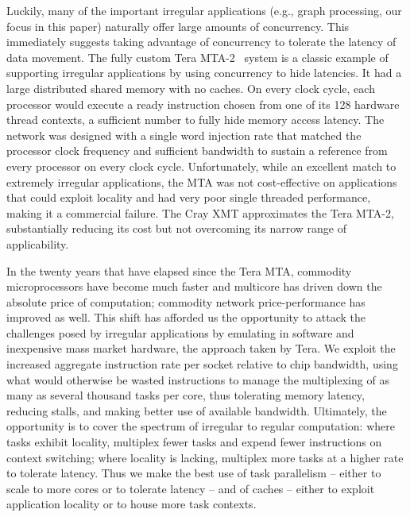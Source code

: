Luckily, many of the important irregular applications (e.g., graph
processing, our focus in this paper) naturally offer large amounts of
concurrency. This immediately suggests taking advantage of concurrency
to tolerate the latency of data movement. The fully custom Tera
MTA-2~\cite{mta-2} system is a classic example of supporting irregular
applications by using concurrency to hide latencies. It had a large
distributed shared memory with no caches.  On every clock cycle, each
processor would execute a ready instruction chosen from one of its 128
hardware thread contexts, a sufficient number to fully hide memory
access latency.  The network was designed with a single word injection
rate that matched the processor clock frequency and sufficient bandwidth
to sustain a reference from every processor on every clock cycle.
Unfortunately, while an excellent match to extremely irregular
applications, the MTA was not cost-effective on applications that could
exploit locality and had very poor single threaded performance, making
it a commercial failure. The Cray XMT approximates the Tera MTA-2,
substantially reducing its cost but not overcoming its narrow range of
applicability.


% 
% 
% 

In the twenty years that have elapsed since the Tera MTA, commodity microprocessors have become much faster and multicore has driven down the absolute price of computation; commodity network price-performance has improved as well.  This shift has afforded us the opportunity to attack the challenges posed by irregular applications by emulating in software and inexpensive mass market hardware, the approach taken by Tera. We exploit the increased aggregate instruction rate per socket relative to chip bandwidth, using what would otherwise be wasted instructions to manage the multiplexing of as many as several thousand tasks per core, thus tolerating memory latency, reducing stalls, and making better use of available bandwidth.  Ultimately, the opportunity is to cover the spectrum of irregular to regular computation: where tasks exhibit locality, multiplex fewer tasks and expend fewer instructions on context switching; where locality is lacking, multiplex more tasks at a higher rate to tolerate latency.  Thus we make the best use of task parallelism -- either to scale to more cores or to tolerate latency -- and of caches -- either to exploit application locality or to house more task contexts.

